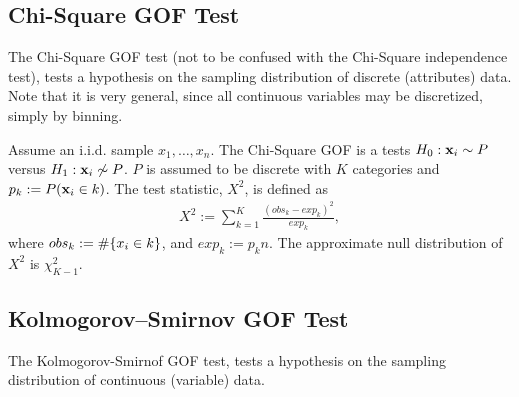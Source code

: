 \documentclass[12pt,a4paper]{report}
\begin{document}
\subsection{Chi-Square GOF Test}
The Chi-Square GOF test (not to be confused with the Chi-Square independence test), tests a hypothesis on the sampling distribution of discrete (attributes) data. 
Note that it is very general, since all continuous variables may be discretized, simply by binning.

\begin{definition}
Assume an i.i.d. sample $x_1,\dots,x_n$. 
The Chi-Square GOF is a tests $H_0: \mathbf{x}_i \sim P$ versus $H_1: \mathbf{x}_i \not\sim P$.
$P$ is assumed to be discrete with $K$ categories and $p_k:= P(\mathbf{x}_i \in k)$.
The test statistic, $X^2$, is defined as
\begin{align}
	X^2:= \sum_{k=1}^{K}\frac{(obs_k-exp_k)^2}{exp_k}, 
\end{align}
where $obs_k:= \#\{ x_i \in k \}$, and $exp_k:= p_k n$.
The approximate null distribution of $X^2$ is $\chi^2_{K-1}$.
\end{definition} 



\subsection{Kolmogorov–Smirnov GOF Test}
The Kolmogorov-Smirnof GOF test, tests a hypothesis on the sampling distribution of continuous (variable) data. 
\end{document}
